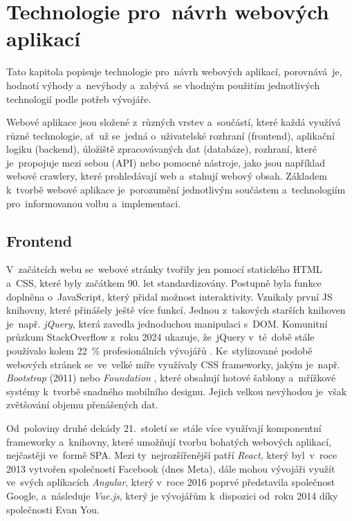\chapter{Technologie pro~návrh webových aplikací}
\label{ch:initial-research}

Tato kapitola popisuje technologie pro~návrh webových aplikací, 
porovnává~je, hodnotí výhody a~nevýhody a~zabývá~se vhodným použitím
jednotlivých technologií podle potřeb vývojáře.

Webové aplikace jsou složené z~různých vrstev a~součástí, které každá
využívá různé technologie, ať~už se~jedná o~uživatelské rozhraní (frontend),
aplikační logiku (backend), úložiště zpracovávaných dat (databáze),
rozhraní, které je~propojuje mezi sebou (API) nebo pomocné nástroje,
jako jsou například webové crawlery, které prohledávají web a~stahují
webový obsah. Základem k~tvorbě webové aplikace je~porozumění jednotlivým
součástem a~technologiím pro~informovanou volbu a~implementaci.
\cite{YHVfLHsNlUItkF6G} %

\section{Frontend}
\label{sec:research-frontend}

V~začátcích webu se~webové stránky tvořily jen pomocí statického HTML a~CSS,
které byly začátkem 90. let standardizovány. Postupně byla funkce doplněna
o~JavaScript, který přidal možnost interaktivity. Vznikaly první JS knihovny,
které přinášely ještě více funkcí. Jednou z~takových starších knihoven
je~např. \emph{jQuery}, která zavedla jednoduchou manipulaci s~DOM.
Komunitní průzkum StackOverflow z~roku 2024 ukazuje, že~jQuery v~té~době
stále používalo kolem 22~\% profesionálních vývojářů
\cite{YHVfLHsNlUItkF6G,w6F4OYb0neliWLGP}. %
Ke~stylizované podobě webových stránek se~ve~velké míře využívaly CSS
frameworky, jakým je~např. \emph{Bootstrap} (2011) nebo \emph{Foundation}
\cite{YHVfLHsNlUItkF6G,Nsz2b52zS5s0JglP}, %
které obsahují hotové šablony a~mřížkové systémy k~tvorbě snadného mobilního
designu. Jejich velkou nevýhodou je~však zvětšování objemu přenášených dat.

Od~poloviny druhé dekády 21.~století se~stále více využívají komponentní
frameworky a~knihovny, které umožňují tvorbu bohatých webových aplikací,
nejčastěji ve~formě SPA. Mezi ty~nejrozšířenější patří \emph{React},
který byl~v~roce 2013 vytvořen společností Facebook (dnes Meta), dále
mohou vývojáři využít ve~svých aplikacích \emph{Angular}, který v~roce
2016 poprvé představila společnost Google, a~následuje \emph{Vue.js},
který je vývojářům k~dispozici od~roku 2014 díky společnosti Evan You.
\cite{YHVfLHsNlUItkF6G,1WL9hIh67tHjtVTy} %


